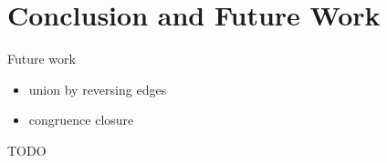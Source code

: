 \documentclass[
  sigplan,
  10pt,
  anonymous,
  review,
  ]{acmart}
\begin{document}

\section{Conclusion and Future Work}
Future work
\begin{itemize}
  \item union by reversing edges
  \item congruence closure
\end{itemize}

\begin{acks}
  TODO
\end{acks}

\printglossary[type=\acronymtype]

\listoftodos{}



\end{document}
